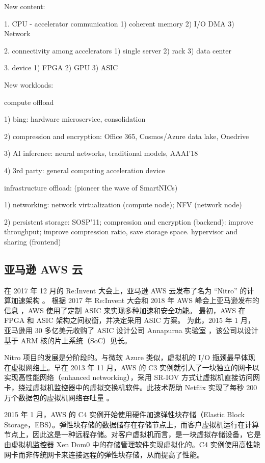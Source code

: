 New content:

1. CPU - accelerator communication
1) coherent memory
2) I/O DMA
3) Network

2. connectivity among accelerators
1) single server
2) rack
3) data center

3. device
1) FPGA
2) GPU
3) ASIC

New workloads:

compute offload

1) bing: hardware microservice, consolidation

2) compression and encryption: Office 365, Cosmos/Azure data lake, Onedrive

3) AI inference: neural networks, traditional models, AAAI'18

4) 3rd party: general computing acceleration device

infrastructure offload: (pioneer the wave of SmartNICs)

1) networking: network virtualization (compute node); NFV (network node)

2) persistent storage: SOSP'11; compression and encryption (backend): improve throughput; improve compression ratio, save storage space.
hypervisor and sharing (frontend)


\subsection{亚马逊 AWS 云}

在 2017 年 12 月的 Re:Invent 大会上，亚马逊 AWS 云发布了名为 ``Nitro'' 的计算加速架构 \cite{nitro-blog}。
根据 2017 年 Re:Invent 大会和 2018 年 AWS 峰会上亚马逊发布的信息 \cite{nitro-talk,nitro-web}，AWS 使用了定制 ASIC 来实现多种加速和安全功能。
最初，AWS 在 FPGA 和 ASIC 架构之间权衡，并决定采用 ASIC 方案。
为此，2015 年 1 月，亚马逊用 30 多亿美元收购了 ASIC 设计公司 Annapurna 实验室 \cite{annapurna}，该公司以设计基于 ARM 核的片上系统（SoC）见长。

Nitro 项目的发展是分阶段的。与微软 Azure 类似，虚拟机的 I/O 瓶颈最早体现在虚拟网络上。早在 2013 年 11 月，AWS 的 C3 实例就引入了一块独立的网卡以实现高性能网络（enhanced networking），采用 SR-IOV 方式让虚拟机直接访问网卡，绕过虚拟机监控器中的虚拟交换机软件。此技术帮助 Netflix 实现了每秒 200 万个数据包的虚拟机网络吞吐量 \cite{netflix-aws}。

2015 年 1 月，AWS 的 C4 实例开始使用硬件加速弹性块存储（Elastic Block Storage，EBS）。弹性块存储的数据储存在存储节点上，而客户虚拟机运行在计算节点上，因此这是一种远程存储。对客户虚拟机而言，是一块虚拟存储设备，它是由虚拟机监控器 Xen Dom0 中的存储管理软件实现虚拟化的。C4 实例使用高性能网卡而非传统网卡来连接远程的弹性块存储，从而提高了性能。

